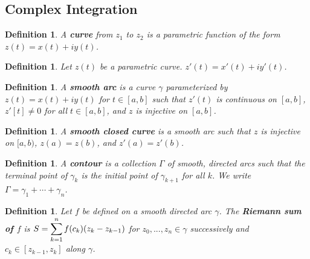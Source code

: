 \documentclass{article}
\theoremstyle{colontheorem}
\newtheorem{definition}[theorem]{Definition}
\newenvironment{Def}
{
	\begin{mdframed}[backgroundcolor=DefGreen!10]
	\begin{definition}
}
{
	\end{definition}
	\end{mdframed}
	
	\vspace{.15in}
}
\begin{document}
\begin{center}
	\pagebreak
	
	\section{Complex Integration}
	
	\vspace{.1in}
\end{center}



\begin{Def}
	
	A \textbf{curve} from $z_1$ to $z_2$ is a parametric function of the form $z(t) = x(t) + iy(t)$.
	
\end{Def}



\begin{Def}
	
	Let $z(t)$ be a parametric curve. $z'(t) = x'(t) + iy'(t)$.
	
\end{Def}



\begin{Def}
	
	A \textbf{smooth arc} is a curve $\gamma$ parameterized by $z(t) = x(t) + iy(t)$ for $t \in [a, b]$ such that $z'(t)$ is continuous on $[a, b]$, $z'[t] \neq 0$ for all $t \in [a, b]$, and $z$ is injective on $[a, b]$.
	
\end{Def}



\begin{Def}
	
	A \textbf{smooth closed curve} is a smooth arc such that $z$ is injective on $[a, b)$, $z(a) = z(b)$, and $z'(a) = z'(b)$.
	
\end{Def}



\begin{Def}
	
	A \textbf{contour} is a collection $\Gamma$ of smooth, directed arcs such that the terminal point of $\gamma_k$ is the initial point of $\gamma_{k+1}$ for all $k$. We write $\Gamma = \gamma_1 + \cdots + \gamma_n$.
	
\end{Def}



\begin{Def}
	
	Let $f$ be defined on a smooth directed arc $\gamma$. The \textbf{Riemann sum of $f$} is $S = \displaystyle\displaystyle\sum\limits_{k = 1}^n f(c_k)(z_k - z_{k-1})$ for $z_0, ..., z_n \in \gamma$ successively and $c_k \in [z_{k-1}, z_k]$ along $\gamma$.
	
\end{Def}
\end{document}
